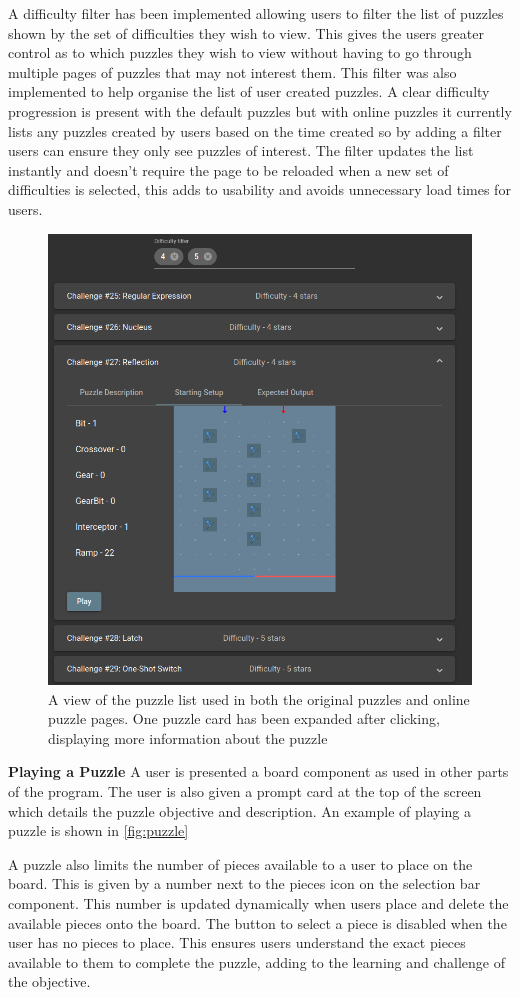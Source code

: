 \documentclass{l4proj}
\begin{document}
A difficulty filter has been implemented allowing users to filter the list of puzzles shown by the set of difficulties they wish to view. This gives the users greater control as to which puzzles they wish to view without having to  go through multiple pages of puzzles that may not interest them. This filter was also implemented to help organise the list of user created puzzles. A clear difficulty progression is present with the default puzzles but with online puzzles it currently lists any puzzles created by users based on the time created so by adding a filter users can ensure they only see puzzles of interest. The filter updates the list instantly and doesn't require the page to be reloaded when a new set of difficulties is selected, this adds to usability and avoids unnecessary load times for users.

\begin{figure}
    \centering
    \includegraphics[width=0.7\linewidth]{images/puzzleList.png}
    \caption{A view of the puzzle list used in both the original puzzles and online puzzle pages. One puzzle card has been expanded after clicking, displaying more information about the puzzle}
    \label{fig:marbleInPlay}
\end{figure}

\textbf{Playing a Puzzle}
A user is presented a board component as used in other parts of the program. The user is also given a prompt card at the top of the screen which details the puzzle objective and description. An example of playing a puzzle is shown in \ref{fig:puzzle}

A puzzle also limits the number of pieces available to a user to place on the board. This is given by a number next to the pieces icon on the selection bar component. This number is updated dynamically when users place and delete the available pieces onto the board. The button to select a piece is disabled when the user has no pieces to place. This ensures users understand the exact pieces available to them to complete the puzzle, adding to the learning and challenge of the objective. 
\end{document}
